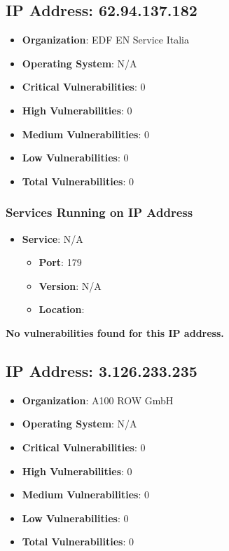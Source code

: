 \documentclass{article}
\begin{document}
\clearpage



\subsection{IP Address: 62.94.137.182}

\begin{itemize}
    \item \textbf{Organization}: EDF EN Service Italia
    \item \textbf{Operating System}:  N/A 
    \item \textbf{Critical Vulnerabilities}: 0
    \item \textbf{High Vulnerabilities}: 0
    \item \textbf{Medium Vulnerabilities}: 0
    \item \textbf{Low Vulnerabilities}: 0
    \item \textbf{Total Vulnerabilities}: 0
\end{itemize}

\subsubsection*{Services Running on IP Address}

\begin{itemize}
    
        \item \textbf{Service}: N/A
        \begin{itemize}
            \item \textbf{Port}: 179
            \item \textbf{Version}:  N/A 
            \item \textbf{Location}: \href{  }{  }
        \end{itemize}
    
\end{itemize}


\textbf{No vulnerabilities found for this IP address.}




\clearpage



\subsection{IP Address: 3.126.233.235}

\begin{itemize}
    \item \textbf{Organization}: A100 ROW GmbH
    \item \textbf{Operating System}:  N/A 
    \item \textbf{Critical Vulnerabilities}: 0
    \item \textbf{High Vulnerabilities}: 0
    \item \textbf{Medium Vulnerabilities}: 0
    \item \textbf{Low Vulnerabilities}: 0
    \item \textbf{Total Vulnerabilities}: 0
\end{itemize}
\end{document}
